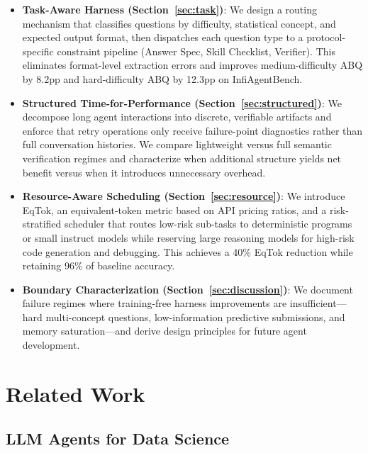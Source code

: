 \documentclass[letterpaper]{article} %
\begin{document}
\begin{itemize}
    \item \textbf{Task-Aware Harness (Section~\ref{sec:task})}: We design a routing mechanism that classifies questions by difficulty, statistical concept, and expected output format, then dispatches each question type to a protocol-specific constraint pipeline (Answer Spec, Skill Checklist, Verifier). This eliminates format-level extraction errors and improves medium-difficulty ABQ by 8.2pp and hard-difficulty ABQ by 12.3pp on InfiAgentBench.
    \item \textbf{Structured Time-for-Performance (Section~\ref{sec:structured})}: We decompose long agent interactions into discrete, verifiable artifacts and enforce that retry operations only receive failure-point diagnostics rather than full conversation histories. We compare lightweight versus full semantic verification regimes and characterize when additional structure yields net benefit versus when it introduces unnecessary overhead.
    \item \textbf{Resource-Aware Scheduling (Section~\ref{sec:resource})}: We introduce EqTok, an equivalent-token metric based on API pricing ratios, and a risk-stratified scheduler that routes low-risk sub-tasks to deterministic programs or small instruct models while reserving large reasoning models for high-risk code generation and debugging. This achieves a 40\% EqTok reduction while retaining 96\% of baseline accuracy.
    \item \textbf{Boundary Characterization (Section~\ref{sec:discussion})}: We document failure regimes where training-free harness improvements are insufficient---hard multi-concept questions, low-information predictive submissions, and memory saturation---and derive design principles for future agent development.
\end{itemize}

\section{Related Work}

\subsection{LLM Agents for Data Science}
\end{document}
